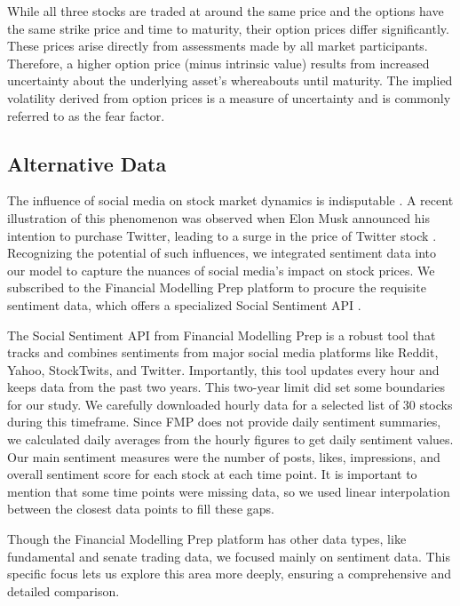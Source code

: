 \documentclass[12pt]{article}
\begin{document}
While all three stocks are traded at around the same price and the options have the same strike price and time to maturity, their option prices differ significantly. These prices arise directly from assessments made by all market participants. Therefore, a higher option price (minus intrinsic value) results from increased uncertainty about the underlying asset's whereabouts until maturity. The implied volatility derived from option prices is a measure of uncertainty and is commonly referred to as the fear factor. \cite{Joshi2008}  \cite{Hull2021} \\ 

\subsection{Alternative Data}%
The influence of social media on stock market dynamics is indisputable \cite{SocialMedia_stockmarket} . A recent illustration of this phenomenon was observed when Elon Musk announced his intention to purchase Twitter, leading to a surge in the price of Twitter stock \cite{IlonMuskTwitterWebpage}.  Recognizing the potential of such influences, we integrated sentiment data into our model to capture the nuances of social media's impact on stock prices.
We subscribed to the Financial Modelling Prep platform \cite{FMP_documentation} to procure the requisite sentiment data, which offers a specialized Social Sentiment API \cite{FMP_Sentiment_documentation}.

The Social Sentiment API from Financial Modelling Prep is a robust tool that tracks and combines sentiments from major social media platforms like Reddit, Yahoo, StockTwits, and Twitter. Importantly, this tool updates every hour and keeps data from the past two years. This two-year limit did set some boundaries for our study. We carefully downloaded hourly data for a selected list of 30 stocks during this timeframe. Since FMP does not provide daily sentiment summaries, we calculated daily averages from the hourly figures to get daily sentiment values. Our main sentiment measures were the number of posts, likes, impressions, and overall sentiment score for each stock at each time point. It is important to mention that some time points were missing data, so we used linear interpolation between the closest data points to fill these gaps.


Though the Financial Modelling Prep platform has other data types, like fundamental and senate trading data, we focused mainly on sentiment data. This specific focus lets us explore this area more deeply, ensuring a comprehensive and detailed comparison.
\end{document}
